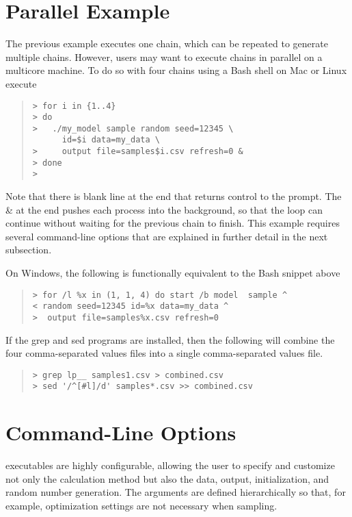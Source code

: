 \section{Parallel Example}

The previous example executes one chain, which can be repeated to 
generate multiple chains. However, users may want to execute chains
in parallel on a multicore machine. To do so with four chains using
a Bash shell on Mac or Linux execute
%
\begin{quote}
\begin{Verbatim}[fontshape=sl,fontsize=\small]
> for i in {1..4}
> do
>   ./my_model sample random seed=12345 \ 
      id=$i data=my_data \
>     output file=samples$i.csv refresh=0 &
> done
>
\end{Verbatim}
\end{quote}
%
Note that there is blank line at the end that returns control to the
prompt. The \& at the end pushes each process into the background, so
that the loop can continue without waiting for the previous chain to 
finish. This example requires several command-line options that are
explained in further detail in the next subsection. 

On Windows, the following is functionally equivalent to the Bash
snippet above
%
\begin{quote}
\begin{Verbatim}[fontshape=sl,fontsize=\small]
> for /l %x in (1, 1, 4) do start /b model  sample ^
< random seed=12345 id=%x data=my_data ^
>  output file=samples%x.csv refresh=0
\end{Verbatim}
\end{quote}
%
If the grep and sed programs are installed, then the following will
combine the four comma-separated values files into a single
comma-separated values file.
%
\begin{quote}
\begin{Verbatim}[fontshape=sl,fontsize=\small]
> grep lp__ samples1.csv > combined.csv
> sed '/^[#l]/d' samples*.csv >> combined.csv 
\end{Verbatim}
\end{quote}
%
\section{Command-Line Options}\label{stan-command-line-options.section}

\Stan executables are highly configurable, allowing the user to specify
and customize not only the calculation method but also the data, output,
initialization, and random number generation.  The arguments are defined
hierarchically so that, for example, optimization settings are not necessary
when sampling.  

